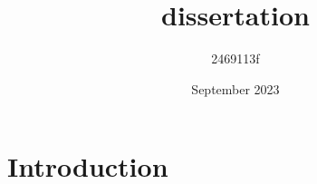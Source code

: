 \documentclass{article}
\title{dissertation}
\author{2469113f }
\date{September 2023}
\begin{document}
\maketitle

\section{Introduction}
\end{document}
